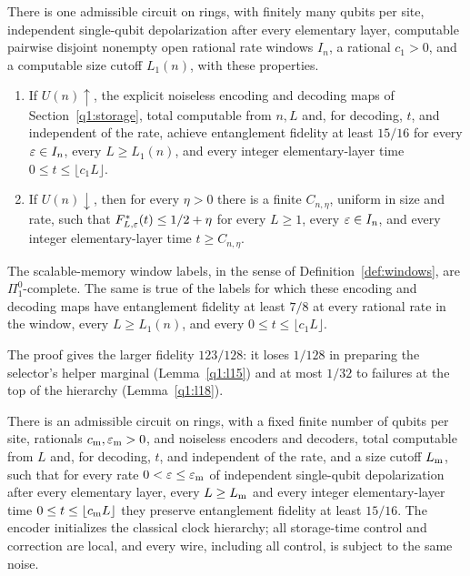 \begin{maintheorem}\label{q1:main}
There is one admissible circuit on rings, with finitely many qubits per site, independent single-qubit depolarization after every elementary layer, computable pairwise disjoint nonempty open rational rate windows \(I_n\), a rational \(c_1>0\), and a computable size cutoff \(L_1(n)\), with these properties.
\begin{enumerate}
\item If \(U(n)\uparrow\), the explicit noiseless encoding and decoding maps of Section~\ref{q1:storage}, total computable from \(n,L\) and, for decoding, \(t\), and independent of the rate, achieve entanglement fidelity at least \(15/16\) for every \(\varepsilon\in I_n\), every \(L\ge L_1(n)\), and every integer elementary-layer time \(0\le t\le\lfloor c_1L\rfloor\).
\item If \(U(n)\downarrow\), then for every \(\eta>0\) there is a finite \(C_{n,\eta}\), uniform in size and rate, such that \(F^*_{L,\varepsilon}(t)\le1/2+\eta\) for every \(L\ge1\), every \(\varepsilon\in I_n\), and every integer elementary-layer time \(t\ge C_{n,\eta}\).
\end{enumerate}
The scalable-memory window labels, in the sense of Definition~\ref{def:windows}, are \(\Pi^0_1\)-complete. The same is true of the labels for which these encoding and decoding maps have entanglement fidelity at least \(7/8\) at every rational rate in the window, every \(L\ge L_1(n)\), and every \(0\le t\le\lfloor c_1L\rfloor\).
\end{maintheorem}
The proof gives the larger fidelity \(123/128\): it loses \(1/128\) in preparing the selector's helper marginal (Lemma~\ref{q1:l15}) and at most \(1/32\) to failures at the top of the hierarchy (Lemma~\ref{q1:l18}).

\begin{corollary}\label{q1:memory}
There is an admissible circuit on rings, with a fixed finite number of qubits per site, rationals \(c_{\rm m},\varepsilon_{\rm m}>0\), and noiseless encoders and decoders, total computable from \(L\) and, for decoding, \(t\), and independent of the rate, and a size cutoff \(L_{\rm m}\), such that for every rate \(0<\varepsilon\le\varepsilon_{\rm m}\) of independent single-qubit depolarization after every elementary layer, every \(L\ge L_{\rm m}\) and every integer elementary-layer time \(0\le t\le\lfloor c_{\rm m}L\rfloor\) they preserve entanglement fidelity at least \(15/16\). The encoder initializes the classical clock hierarchy; all storage-time control and correction are local, and every wire, including all control, is subject to the same noise.
\end{corollary}

